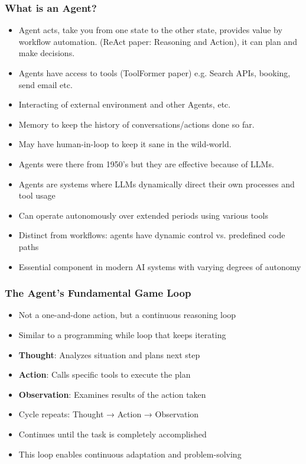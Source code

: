 \begin{frame}[fragile]\frametitle{What is an Agent?}
    \begin{itemize}
        \item Agent acts, take you from one state to the other state, provides value by workflow automation. (ReAct paper: Reasoning and Action), it can plan and make decisions.
		\item Agents have access to tools (ToolFormer paper) e.g. Search APIs, booking, send email etc.
		\item Interacting of external environment and other Agents, etc.
		\item Memory to keep the history of conversations/actions done so far.
		\item May have human-in-loop to keep it sane in the wild-world.
		\item Agents were there from 1950's but they are effective because of LLMs.
        \item Agents are systems where LLMs dynamically direct their own processes and tool usage
        \item Can operate autonomously over extended periods using various tools
        \item Distinct from workflows: agents have dynamic control vs. predefined code paths
        \item Essential component in modern AI systems with varying degrees of autonomy
    \end{itemize}
\end{frame}

\begin{frame}[fragile]\frametitle{The Agent's Fundamental Game Loop}
      \begin{itemize}
        \item Not a one-and-done action, but a continuous reasoning loop
        \item Similar to a programming while loop that keeps iterating
        \item \textbf{Thought}: Analyzes situation and plans next step
        \item \textbf{Action}: Calls specific tools to execute the plan
        \item \textbf{Observation}: Examines results of the action taken
        \item Cycle repeats: Thought → Action → Observation
        \item Continues until the task is completely accomplished
        \item This loop enables continuous adaptation and problem-solving
      \end{itemize}
\end{frame}

